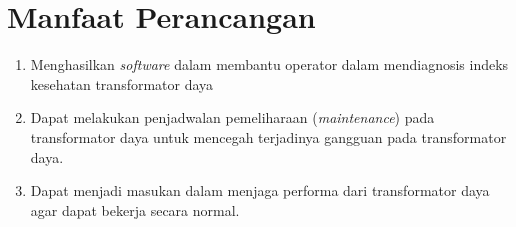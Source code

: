 \section{Manfaat Perancangan}
\begin{enumerate}
	\item Menghasilkan \textit{software} dalam membantu operator dalam mendiagnosis indeks kesehatan transformator daya
	\item Dapat melakukan penjadwalan pemeliharaan (\textit{maintenance}) pada transformator daya untuk mencegah terjadinya gangguan pada transformator daya.
	\item Dapat menjadi masukan dalam menjaga performa dari transformator daya agar dapat bekerja secara normal.
	 
\end{enumerate}

